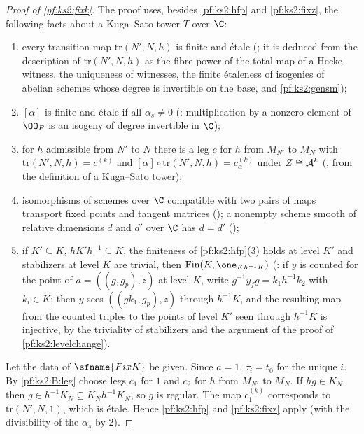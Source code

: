 \begin{proof}[Proof of \cref{pf:ks2:fixk}]
The proof uses, besides \cref{pf:ks2:hfp} and
\cref{pf:ks2:fixz}, the following facts about a Kuga--Sato tower $T$ over $\C$:
\begin{enumerate}[label=(B\arabic*)]
\item\label{pf:ks2:B:tr} every transition map $\mathrm{tr}(N',N,h)$ is finite and \'etale
  (; it is deduced from the
  description of $\mathrm{tr}(N',N,h)$ as the fibre power of the total map of a Hecke witness, the
  uniqueness of witnesses, the finite \'etaleness of isogenies of abelian schemes whose degree is
  invertible on the base, and \cref{pf:ks2:gensm});
\item\label{pf:ks2:B:al} $[\alpha]$ is finite and \'etale if all $\alpha_s\ne0$
  (: multiplication by a nonzero element of $\kstwoOF$ is an
  isogeny of degree invertible in $\C$);
\item\label{pf:ks2:B:leg} for $h$ admissible from $N'$ to $N$ there is a leg $c$ for $h$ from
  $M_{N'}$ to $M_N$ with $\mathrm{tr}(N',N,h)=c^{(k)}$ and $[\alpha]\circ\mathrm{tr}(N',N,h)=c^{(k)}_\alpha$
  under $Z\cong\mathcal{A}^k$ (, from the definition of a
  Kuga--Sato tower);
\item\label{pf:ks2:B:tan} isomorphisms of schemes over $\C$ compatible with two pairs of maps transport
  fixed points and tangent matrices (); a nonempty scheme smooth
  of relative dimensions $d$ and $d'$ over $\C$ has $d=d'$ ();
\item\label{pf:ks2:B:cx} if $K'\subseteq K$, $hK'h^{-1}\subseteq K$, the finiteness of \cref{pf:ks2:hfp}(3)
  holds at level $K'$ and stabilizers at level $K$ are trivial, then $\mathrm{Fin}(K,\one_{Kh^{-1}K})$
  (: if $y$ is counted for the point of $a=((g,g_p),z)$ at
  level $K$, write $g^{-1}y_fg=k_1h^{-1}k_2$ with $k_i\in K$; then $y$ sees $((gk_1,g_p),z)$ through
  $h^{-1}K$, and the resulting map from the counted triples to the points of level $K'$ seen through
  $h^{-1}K$ is injective, by the triviality of stabilizers and the argument of the proof of
  \cref{pf:ks2:levelchange}).
\end{enumerate}
Let the data of $\sfname{FixK}$ be given. Since $a=1$, $\tau_i=t_0$ for the unique $i$. By \ref{pf:ks2:B:leg}
choose legs $c_1$ for $1$ and $c_2$ for $h$ from $M_{N'}$ to $M_N$. If $hg\in K_N$ then
$g\in h^{-1}K_N\subseteq K_Nh^{-1}K_N$, so $g$ is regular. The map $c_1^{(k)}$ corresponds to
$\mathrm{tr}(N',N,1)$, which is \'etale. Hence \cref{pf:ks2:hfp} and \cref{pf:ks2:fixz} apply (with the
divisibility of the $\alpha_s$ by $2$).


\end{proof}
